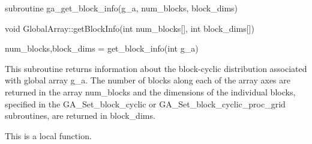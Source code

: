 \documentclass[12pt]{article}
\begin{document}
\begin{fapi}
\begin{fcode}
subroutine ga_get_block_info(g_a, num_blocks, block_dims)
\end{fcode}
\begin{funcargs}
\end{funcargs}
\end{fapi}

\begin{cxxapi}
\begin{cxxcode}
void GlobalArray::getBlockInfo(int num_blocks[], int block_dims[])
\end{cxxcode}
\begin{funcargs}
\end{funcargs}
\end{cxxapi}

\begin{pyapi}
\begin{pycode}
num_blocks,block_dims = get_block_info(int g_a)
\end{pycode}
\begin{funcargs}
\end{funcargs}
\end{pyapi}

\local

\begin{desc}

This subroutine returns information about the block-cyclic distribution
associated with global array g_a. The number of blocks along each of the array
axes are returned in the array num_blocks and the dimensions of the individual
blocks, specified in the GA_Set_block_cyclic or GA_Set_block_cyclic_proc_grid
subroutines, are returned in block_dims.

This is a local function.

\end{desc}


\end{document}
